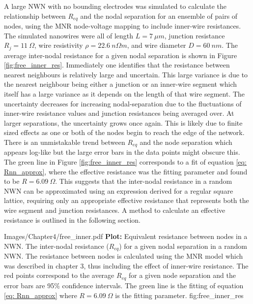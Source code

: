 A large NWN with no bounding electrodes was simulated to calculate the relationship between $R_{eq}$ and the nodal separation for an ensemble of pairs of nodes, using the MNR node-voltage mapping to include inner-wire resistances. The simulated nanowires were all of length $L =7 ~ \mu m$, junction resistance $R_j = 11 ~ \Omega$, wire resistivity $\rho = 22.6 ~ n \Omega m$, and wire diameter $D = 60 ~ nm$. The average inter-nodal resistance for a given nodal separation is shown in Figure \ref{fig:free_inner_res}. Immediately one identifies that the resistance between nearest neighbours is relatively large and uncertain. This large variance is due to the nearest neighbour being either a junction or an inner-wire segment which itself has a large variance as it depends on the length of that wire segment. The uncertainty decreases for increasing nodal-separation due to the fluctuations of inner-wire resistance values and junction resistances being averaged over. At larger separations, the uncertainty grows once again. This is likely due to finite sized effects as one or both of the nodes begin to reach the edge of the network. There is an unmistakable trend between $R_{eq}$ and the node separation which appears log-like but the large error bars in the data points might obscure this. The green line in Figure \ref{fig:free_inner_res} corresponds to a fit of equation \ref{eq: Rnn_approx}, where the effective resistance was the fitting parameter and found to be $R = 6.09 ~ \Omega$. This suggests that the inter-nodal resistance in a random NWN can be approximated using an expression derived for a regular square lattice, requiring only an appropriate effective resistance that represents both the wire segment and junction resistances. A method to calculate an effective resistance is outlined in the following section. 

{Images/Chapter4/free_inner.pdf}
{\textbf{Plot:} Equivalent resistance between nodes in a NWN.}
{ The inter-nodal resistance ($R_{eq}$) for a given nodal separation in a random NWN. The resistance between nodes is calculated using the MNR model which was described in chapter 3, thus including the effect of inner-wire resistance. The red points correspond to the average $R_{eq}$ for a given node separation and the error bars are 95\% confidence intervals. The green line is the fitting of equation \ref{eq: Rnn_approx} where $R = 6.09 ~ \Omega$ is the fitting parameter.}
{fig:free_inner_res}
